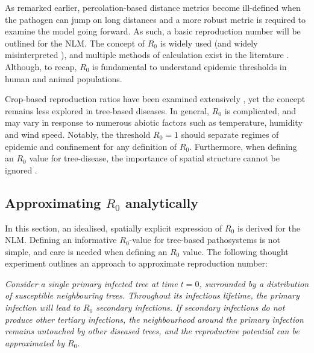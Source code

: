 As remarked earlier, percolation-based distance metrics become ill-defined when the pathogen can jump on long distances and a more robust metric is required to examine the model going forward.
As such, a basic reproduction number will be outlined for the NLM.
The concept of $R_0$ is widely used (and widely misinterpreted \cite{delamater2019complexity}),
and multiple methods of calculation exist in the literature \cite{perspectives-on-r0}.
Although, to recap, $R_0$ is fundamental to understand epidemic thresholds in human and animal populations. 

Crop-based reproduction ratios have been examined extensively
\cite{gubbins2000population, park2001invasion, doi:10.1146/annurev.phyto.011108.135838, van2011periodic},
yet the concept remains less explored in tree-based diseases. 
In general, $R_0$ is complicated, and may vary in response to numerous abiotic factors such as temperature, humidity and wind speed.
Notably, the threshold $R_0=1$ should separate regimes of epidemic and confinement for any definition of $R_0$.
Furthermore, when defining an $R_0$ value for tree-disease, the importance of spatial structure cannot be
ignored \cite{park2001invasion}.


\subsection{Approximating $R_0$ analytically}

In this section, an idealised, spatially explicit expression of $R_0$ is derived for the NLM. Defining an informative $R_0$-value for tree-based pathosystems is not simple, and care is needed when defining an $R_0$ value.  
The following thought experiment outlines an approach to approximate reproduction number:

\textit{Consider a single primary infected tree at time $t=0$, surrounded by a distribution of susceptible neighbouring trees. Throughout its infectious lifetime, the primary infection will lead to $R_0$ secondary infections. If secondary infections do not produce other tertiary infections, the neighbourhood around the primary infection remains untouched by other diseased trees, and the reproductive potential can be approximated by $R_0$.}

